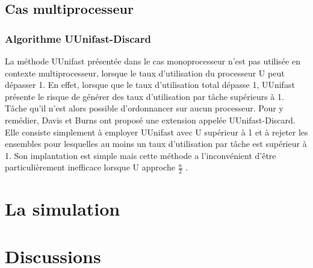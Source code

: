 \subsection{Cas multiprocesseur}
\subsubsection{Algorithme UUnifast-Discard}
La méthode UUnifast présentée dans le cas monoprocesseur n’est pas
utilisée en contexte multiprocesseur, lorsque le taux d’utilisation du
processeur U peut dépasser 1. En effet, lorsque que le taux
d’utilisation total dépasse 1, UUnifast présente le risque de générer
des taux d’utilisation par tâche supérieurs à 1. Tâche qu’il n’est
alors possible d’ordonnancer sur aucun processeur.  Pour y remédier,
Davis et Burns \cite{DB11} ont proposé une extension appelée
UUnifast-Discard. Elle consiste simplement à employer UUnifast avec U
supérieur à 1 et à rejeter les ensembles pour lesquelles au moins un
taux d’utilisation par tâche est supérieur à 1. Son implantation est
simple mais cette méthode a l’inconvénient d’être particulièrement
inefficace lorsque U approche $\frac{n}{2}$ \cite{Emb10}.
\section{La simulation}
\section{Discussions}
